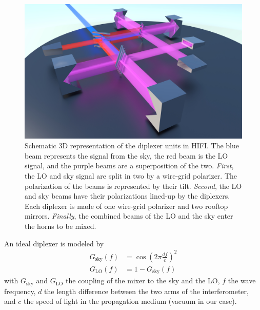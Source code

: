 \begin{figure}[b]
    \centering
    \includegraphics[width=\textwidth]{diplexer_render_lowres}
    \caption{
        Schematic 3D representation of the diplexer units in HIFI.
        The blue beam represents the signal from the sky, the red beam is the LO signal,
        and the purple beams are a superposition of the two.
        \emph{First}, the LO and sky signal are split in two by a wire-grid polarizer.
        The polarization of the beams is represented by their tilt.
        \emph{Second}, the LO and sky beams have their polarizations lined-up by the diplexers.
        Each diplexer is made of one wire-grid polarizer and two rooftop mirrors.
        \emph{Finally}, the combined beams of the LO and the sky enter the horns to be mixed.
    }
    \label{fig:diplexer_render_appendix}
\end{figure}



An ideal diplexer is modeled by
\begin{align}
    G_\text{sky}(f)
    &=
    \cos
    \left(
        2 \pi
        \frac{df}{c}
    \right)^2
    \\
    G_\text{LO}(f)
    &=
    1 - G_\text{sky}(f)
    \label{eq:diplexer_coupling_model}
\end{align}
with $G_\text{sky}$ and $G_\text{LO}$ the coupling of the mixer to the sky and the LO,
$f$ the wave frequency,
$d$ the length difference between the two arms of the interferometer,
and $c$ the speed of light in the propagation medium (vacuum in our case).

